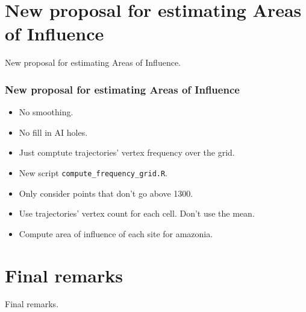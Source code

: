 \documentclass[aspectratio=169]{beamer}
\begin{document}
\section{New proposal for estimating Areas of Influence}



\begin{frame}
    New proposal for estimating Areas of Influence.
\end{frame}

\begin{frame}[fragile]
    \frametitle{New proposal for estimating Areas of Influence}
    \begin{itemize}
        \item No smoothing.
        \item No fill in AI holes.
        \item Just comptute trajectories' vertex frequency over the grid.
        \item New script \verb|compute_frequency_grid.R|.
        \item Only consider points that don't go above 1300.
        \item Use trajectories' vertex count for each cell. Don't use the mean.
        \item Compute area of influence of each site for amazonia.
    \end{itemize}
\end{frame}



\section{Final remarks}



\begin{frame}
    Final remarks.
\end{frame}
\end{document}
